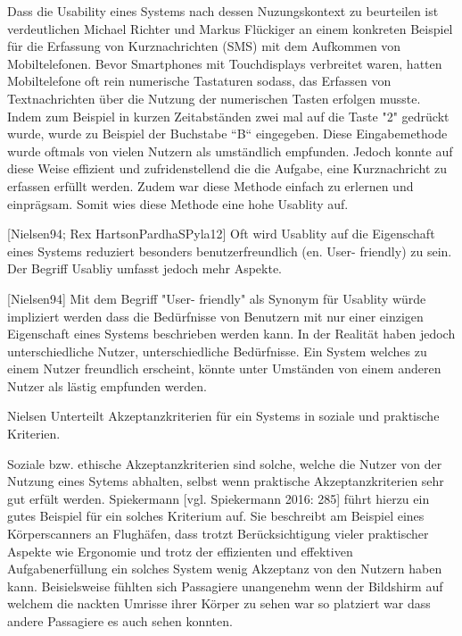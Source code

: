 Dass die Usability eines Systems nach dessen Nuzungskontext zu beurteilen ist verdeutlichen Michael Richter und Markus Flückiger an einem konkreten Beispiel für die Erfassung 
von Kurznachrichten (SMS) mit dem Aufkommen von Mobiltelefonen.  Bevor Smartphones mit Touchdisplays verbreitet waren, hatten Mobiltelefone oft rein numerische Tastaturen sodass, das Erfassen 
von Textnachrichten über die Nutzung der numerischen Tasten erfolgen musste. Indem zum Beispiel in kurzen Zeitabständen zwei mal auf die Taste "2" gedrückt wurde, wurde zu Beispiel der Buchstabe ``B`` eingegeben. 
Diese Eingabemethode wurde oftmals von vielen Nutzern als umständlich empfunden. Jedoch konnte auf diese Weise effizient und zufridenstellend die die Aufgabe, eine Kurznachricht zu erfassen erfüllt werden. 
Zudem war diese Methode einfach zu erlernen und einprägsam. Somit wies diese Methode eine hohe Usablity auf. 

[Nielsen94; Rex HartsonPardhaSPyla12] Oft wird Usablity auf die Eigenschaft eines Systems reduziert besonders benutzerfreundlich (en. User- friendly) zu sein. Der Begriff Usabliy umfasst jedoch mehr Aspekte. 

[Nielsen94] Mit dem Begriff "User- friendly" als Synonym für Usablity würde impliziert werden dass die Bedürfnisse von Benutzern mit nur einer einzigen Eigenschaft eines Systems beschrieben werden kann. 
In der Realität haben jedoch unterschiedliche Nutzer, unterschiedliche Bedürfnisse. Ein System welches zu einem Nutzer freundlich erscheint, könnte unter Umständen von einem anderen Nutzer als lästig empfunden werden.

Nielsen Unterteilt Akzeptanzkriterien für ein Systems in soziale und praktische Kriterien.

Soziale bzw. ethische Akzeptanzkriterien sind solche, welche  die Nutzer von der Nutzung eines Sytems abhalten, selbst wenn praktische Akzeptanzkriterien sehr gut erfült werden. 
Spiekermann [vgl. Spiekermann 2016: 285] führt hierzu ein gutes Beispiel für ein solches Kriterium auf. Sie beschreibt am Beispiel eines Körperscanners an Flughäfen, dass trotzt  Berücksichtigung vieler 
praktischer Aspekte wie Ergonomie und trotz der effizienten und effektiven Aufgabenerfüllung ein solches System wenig Akzeptanz von den Nutzern haben kann. Beisielsweise fühlten sich Passagiere 
unangenehm wenn der Bildshirm auf welchem die nackten Umrisse ihrer Körper zu sehen war so platziert war dass andere Passagiere es auch sehen konnten.  

